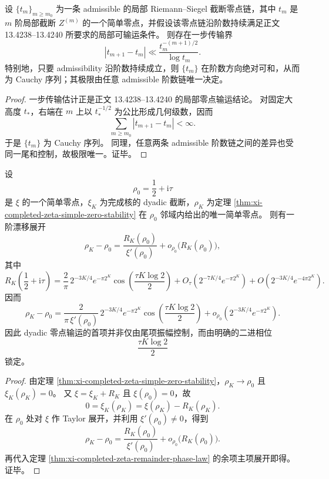 \begin{theorem}\label{thm:conclusion-xi-order-chain-cauchy-rigidity}
设 \(\{t_m\}_{m\ge m_0}\) 为一条 admissible 的局部 Riemann--Siegel 截断零点链，其中 \(t_m\) 是 \(m\) 阶局部截断 \(Z^{(m)}\) 的一个简单零点，并假设该零点链沿阶数持续满足正文 13.4238--13.4240 所要求的局部可输运条件。
则存在一步传输界
\[
|t_{m+1}-t_m|
\ll
\frac{t_m^{-(m+1)/2}}{\log t_m}.
\]
特别地，只要 admissibility 沿阶数持续成立，则 \(\{t_m\}\) 在阶数方向绝对可和，从而为 Cauchy 序列；其极限由任意 admissible 阶数链唯一决定。
\end{theorem}
\begin{proof}
一步传输估计正是正文 13.4238--13.4240 的局部零点输运结论。
对固定大高度 \(t_\ast\)，右端在 \(m\) 上以 \(t_\ast^{-1/2}\) 为公比形成几何级数，因而
\[
\sum_{m\ge m_0}|t_{m+1}-t_m|<\infty.
\]
于是 \(\{t_m\}\) 为 Cauchy 序列。
同理，任意两条 admissible 阶数链之间的差异也受同一尾和控制，故极限唯一。证毕。
\end{proof}

\begin{theorem}[二进递归下简单零点的首项漂移律]\label{thm:conclusion-xi-dyadic-zero-phase-drift}
设
\[
\rho_0=\frac12+\mathrm{i}\tau
\]
是 \(\xi\) 的一个简单零点，\(\xi_K\) 为完成核的 dyadic 截断，\(\rho_K\) 为定理 \ref{thm:xi-completed-zeta-simple-zero-stability} 在 \(\rho_0\) 邻域内给出的唯一简单零点。
则有一阶漂移展开
\[
\rho_K-\rho_0
=
\frac{R_K(\rho_0)}{\xi'(\rho_0)}+o_{\rho_0}\!\bigl(R_K(\rho_0)\bigr),
\]
其中
\[
R_K\!\left(\frac12+\mathrm{i}\tau\right)
=
\frac{2}{\pi}\,2^{-3K/4}e^{-\pi2^K}
\cos\!\left(\frac{\tau K\log2}{2}\right)
+O_\tau\!\left(2^{-7K/4}e^{-\pi2^K}\right)
+O\!\left(2^{-3K/4}e^{-4\pi2^K}\right).
\]
因而
\[
\rho_K-\rho_0
=
\frac{2}{\pi\,\xi'(\rho_0)}\,2^{-3K/4}e^{-\pi2^K}
\cos\!\left(\frac{\tau K\log2}{2}\right)
+o_{\rho_0}\!\left(2^{-3K/4}e^{-\pi2^K}\right).
\]
因此 dyadic 零点输运的首项并非仅由尾项振幅控制，而由明确的二进相位
\[
\frac{\tau K\log2}{2}
\]
锁定。
\end{theorem}
\begin{proof}
由定理 \ref{thm:xi-completed-zeta-simple-zero-stability}，\(\rho_K\to\rho_0\) 且 \(\xi_K(\rho_K)=0\)。
又 \(\xi=\xi_K+R_K\) 且 \(\xi(\rho_0)=0\)，故
\[
0=\xi_K(\rho_K)=\xi(\rho_K)-R_K(\rho_K).
\]
在 \(\rho_0\) 处对 \(\xi\) 作 Taylor 展开，并利用 \(\xi'(\rho_0)\neq0\)，得到
\[
\rho_K-\rho_0=\frac{R_K(\rho_0)}{\xi'(\rho_0)}+o_{\rho_0}\!\bigl(R_K(\rho_0)\bigr).
\]
再代入定理 \ref{thm:xi-completed-zeta-remainder-phase-law} 的余项主项展开即得。证毕。
\end{proof}

